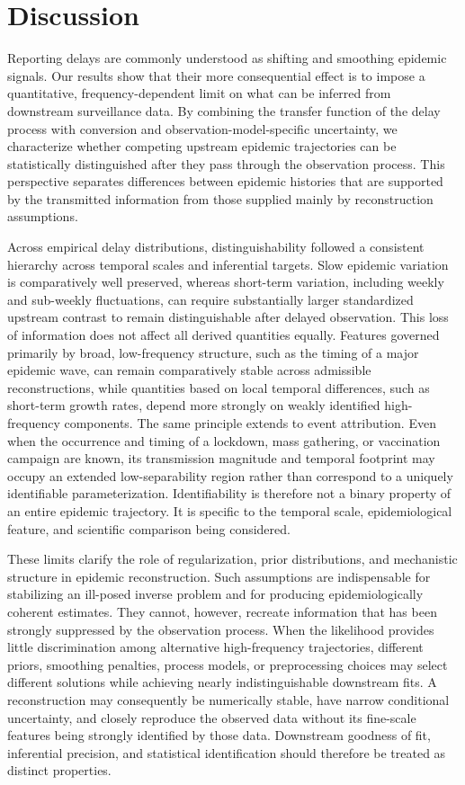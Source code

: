 \section*{Discussion}

Reporting delays are commonly understood as shifting and smoothing epidemic signals. Our results show that their more consequential effect is to impose a quantitative, frequency-dependent limit on what can be inferred from downstream surveillance data. By combining the transfer function of the delay process with conversion and observation-model-specific uncertainty, we characterize whether competing upstream epidemic trajectories can be statistically distinguished after they pass through the observation process. This perspective separates differences between epidemic histories that are supported by the transmitted information from those supplied mainly by reconstruction assumptions.

Across empirical delay distributions, distinguishability followed a consistent hierarchy across temporal scales and inferential targets. Slow epidemic variation is comparatively well preserved, whereas short-term variation, including weekly and sub-weekly fluctuations, can require substantially larger standardized upstream contrast to remain distinguishable after delayed observation. This loss of information does not affect all derived quantities equally. Features governed primarily by broad, low-frequency structure, such as the timing of a major epidemic wave, can remain comparatively stable across admissible reconstructions, while quantities based on local temporal differences, such as short-term growth rates, depend more strongly on weakly identified high-frequency components. The same principle extends to event attribution. Even when the occurrence and timing of a lockdown, mass gathering, or vaccination campaign are known, its transmission magnitude and temporal footprint may occupy an extended low-separability region rather than correspond to a uniquely identifiable parameterization. Identifiability is therefore not a binary property of an entire epidemic trajectory. It is specific to the temporal scale, epidemiological feature, and scientific comparison being considered.

These limits clarify the role of regularization, prior distributions, and mechanistic structure in epidemic reconstruction. Such assumptions are indispensable for stabilizing an ill-posed inverse problem and for producing epidemiologically coherent estimates. They cannot, however, recreate information that has been strongly suppressed by the observation process. When the likelihood provides little discrimination among alternative high-frequency trajectories, different priors, smoothing penalties, process models, or preprocessing choices may select different solutions while achieving nearly indistinguishable downstream fits. A reconstruction may consequently be numerically stable, have narrow conditional uncertainty, and closely reproduce the observed data without its fine-scale features being strongly identified by those data. Downstream goodness of fit, inferential precision, and statistical identification should therefore be treated as distinct properties. 

